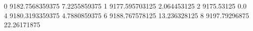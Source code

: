 0 9182.7568359375 7.2255859375
1 9177.595703125 2.064453125
2 9175.53125 0.0
4 9180.3193359375 4.7880859375
6 9188.767578125 13.236328125
8 9197.79296875 22.26171875
